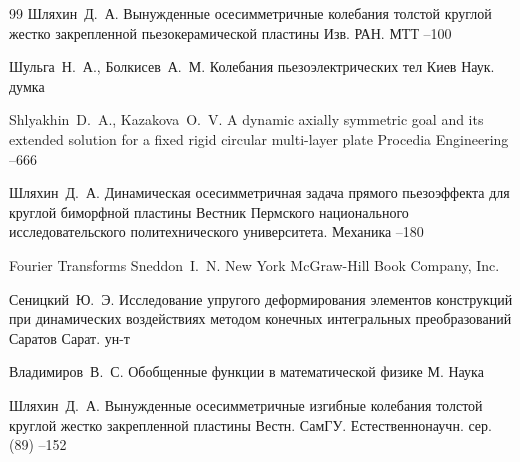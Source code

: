 \begin{thebibliography}{99}
\by Шляхин~Д.~А.
\paper Вынужденные осесимметричные колебания толстой круглой жестко 
закрепленной пьезокерамической пластины
\jour Изв. РАН. МТТ
--100

\by Шульга~Н.~А., Болкисев~А.~М.
\book Колебания пьезоэлектрических тел
\publaddr Киев
\publ Наук. думка

\by Shlyakhin~D.~A., Kazakova~O.~V.
\paper A dynamic axially symmetric goal and its  extended solution for a fixed rigid circular multi-layer plate
\jour Procedia Engineering
--666

\by Шляхин~Д.~А.
\paper Динамическая осесимметричная задача прямого пьезоэффекта для  круглой биморфной пластины
\jour Вестник Пермского национального исследовательского политехнического университета. Механика
--180

\book Fourier Transforms
\by Sneddon~I.~N. 
\publaddr New York
\publ McGraw-Hill Book Company, Inc.

\by Сеницкий~Ю.~Э.
\book Исследование упругого деформирования элементов конструкций при динамических воздействиях методом конечных интегральных преобразований
\publaddr Саратов
\publ Сарат. ун-т

\by Владимиров~В.~С.
\book Обобщенные функции в математической физике
\publaddr М.
\publ Наука


\by Шляхин~Д.~А.
\paper Вынужденные осесимметричные изгибные колебания толстой круглой жестко закрепленной пластины
\jour Вестн. СамГУ. Естественнонаучн. сер.
(89)
--152


\end{thebibliography}


\newpage


\makeentitle

\vspace{-5mm}


